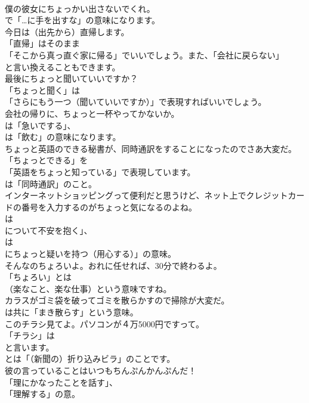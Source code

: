 \documentclass[8pt]{extreport}
\begin{document}
\begin{CJK}{UTF8}{min}
\\	僕の彼女にちょっかい出さないでくれ。 
\\	で「…に手を出すな」の意味になります。	
\\	今日は（出先から）直帰します。 
\\	「直帰」はそのまま
\\	「そこから真っ直ぐ家に帰る」でいいでしょう。また、「会社に戻らない」
\\	と言い換えることもできます。	
\\	最後にちょっと聞いていいですか？ 
\\	「ちょっと聞く」は
\\	「さらにもう一つ（聞いていいですか）」で表現すればいいでしょう。	
\\	会社の帰りに、ちょっと一杯やってかないか。 
\\	は「急いでする」、
\\	は「飲む」の意味になります。	
\\	ちょっと英語のできる秘書が、同時通訳をすることになったのでさあ大変だ。 
\\	「ちょっとできる」を
\\	「英語をちょっと知っている」で表現しています。
\\	は「同時通訳」のこと。	
\\	インターネットショッピングって便利だと思うけど、ネット上でクレジットカードの番号を入力するのがちょっと気になるのよね。 
\\	は
\\	について不安を抱く」、
\\	は
\\	にちょっと疑いを持つ（用心する）」の意味。	
\\	そんなのちょろいよ。おれに任せれば、30分で終わるよ。 
\\	「ちょろい」とは
\\	（楽なこと、楽な仕事）という意味ですね。	
\\	カラスがゴミ袋を破ってゴミを散らかすので掃除が大変だ。 
\\	は共に「まき散らす」という意味。	
\\	このチラシ見てよ。パソコンが４万5000円ですって。 
\\	「チラシ」は
\\	と言います。
\\	とは「（新聞の）折り込みビラ」のことです。	
\\	彼の言っていることはいつもちんぷんかんぷんだ！ 
\\	「理にかなったことを話す」、
\\	「理解する」の意。

\end{CJK}
\end{document}
